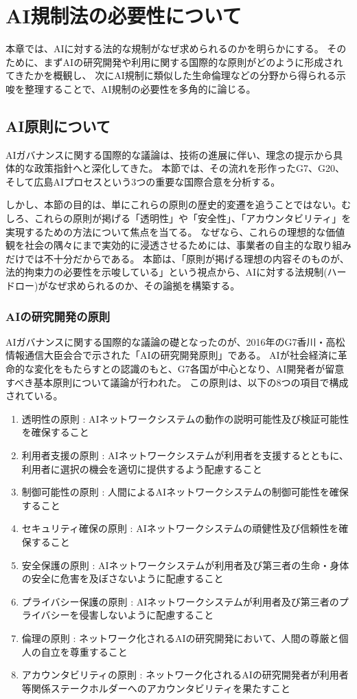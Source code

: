 \chapter{AI規制法の必要性について}
本章では、AIに対する法的な規制がなぜ求められるのかを明らかにする。
そのために、まずAIの研究開発や利用に関する国際的な原則がどのように形成されてきたかを概観し、
次にAI規制に類似した生命倫理などの分野から得られる示唆を整理することで、AI規制の必要性を多角的に論じる。

\section{AI原則について} %
AIガバナンスに関する国際的な議論は、技術の進展に伴い、理念の提示から具体的な政策指針へと深化してきた。
本節では、その流れを形作ったG7、G20、そして広島AIプロセスという3つの重要な国際合意を分析する。

しかし、本節の目的は、単にこれらの原則の歴史的変遷を追うことではない。むしろ、これらの原則が掲げる「透明性」や「安全性」、「アカウンタビリティ」を実現するための方法について焦点を当てる。
なぜなら、これらの理想的な価値観を社会の隅々にまで実効的に浸透させるためには、事業者の自主的な取り組みだけでは不十分だからである。
本節は、「原則が掲げる理想の内容そのものが、法的拘束力の必要性を示唆している」という視点から、AIに対する法規制(ハードロー)がなぜ求められるのか、その論拠を構築する。


\subsection{AIの研究開発の原則} 
AIガバナンスに関する国際的な議論の礎となったのが、2016年のG7香川・高松情報通信大臣会合で示された「AIの研究開発原則」である。
AIが社会経済に革命的な変化をもたらすとの認識のもと、G7各国が中心となり、AI開発者が留意すべき基本原則について議論が行われた。
この原則は、以下の8つの項目で構成されている。

\begin{enumerate}
  \item 透明性の原則 : AIネットワークシステムの動作の説明可能性及び検証可能性を確保すること
  \item 利用者支援の原則 : AIネットワークシステムが利用者を支援するとともに、利用者に選択の機会を適切に提供するよう配慮すること
  \item 制御可能性の原則 : 人間によるAIネットワークシステムの制御可能性を確保すること
  \item セキュリティ確保の原則 : AIネットワークシステムの頑健性及び信頼性を確保すること
  \item 安全保護の原則 : AIネットワークシステムが利用者及び第三者の生命・身体の安全に危害を及ぼさないように配慮すること
  \item プライバシー保護の原則 : AIネットワークシステムが利用者及び第三者のプライバシーを侵害しないように配慮すること
  \item 倫理の原則 : ネットワーク化されるAIの研究開発において、人間の尊厳と個人の自立を尊重すること
  \item アカウンタビリティの原則 : ネットワーク化されるAIの研究開発者が利用者等関係ステークホルダーへのアカウンタビリティを果たすこと
\end{enumerate}

